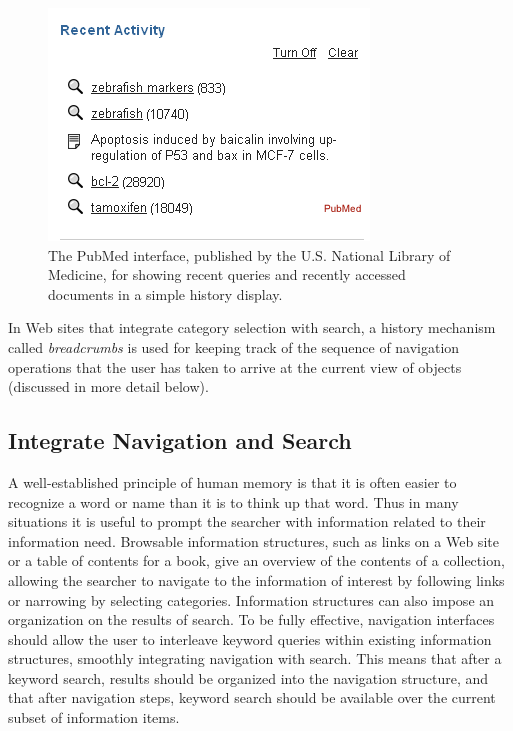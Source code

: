 \documentclass[sigconf,nonacm,screen,pbalance]{acmart}
\begin{document}
\begin{figure}[ht]
    \includegraphics[width=\columnwidth]{./pubmed-recentactivity.png}
    \vspace{-20pt}
    \caption{The PubMed interface, published by the U.S. National Library of
    Medicine, for showing recent queries and recently accessed documents in a simple history display.}
    \label{fig:figure-6}
\end{figure}

In Web sites that integrate category selection with search, a history mechanism called {\em 
breadcrumbs} is used for keeping track of the sequence of navigation operations that the user has
taken to arrive at the current view of objects (discussed in more detail below).

\subsection{Integrate Navigation and Search}

A well-established principle of human memory is that it is often easier to recognize a word or name than
it is to think up that word. Thus in many situations it is useful to prompt the searcher with
information related to their information need. Browsable information structures, such as links on a Web
site or a table of contents for a book, give an overview of the contents of a collection, allowing the
searcher to navigate to the information of interest by following links or narrowing by selecting
categories. Information structures can also impose an organization on the results of search. To be fully
effective, navigation interfaces should allow the user to interleave keyword queries within existing
information structures, smoothly integrating navigation with search. This means that after a keyword
search, results should be organized into the navigation structure, and that after navigation steps,
keyword search should be available over the current subset of information items.
\end{document}
